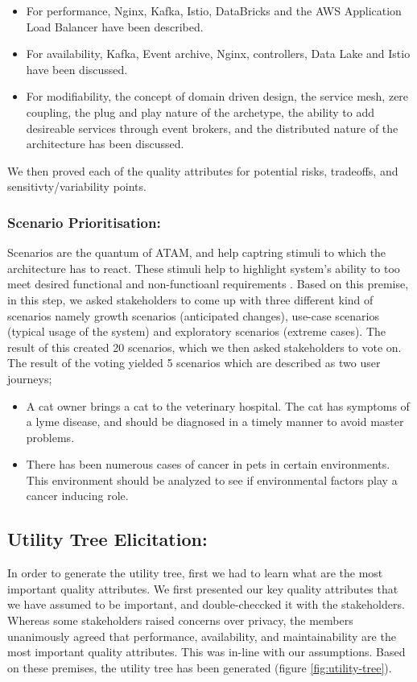 \documentclass[review]{elsarticle}
\begin{document}
\begin{itemize}
    \item For performance, Nginx, Kafka, Istio, DataBricks and the AWS Application Load Balancer have been described.
    \item For availability, Kafka, Event archive, Nginx, controllers, Data Lake and Istio have been discussed.
    \item For modifiability, the concept of domain driven design, the service mesh, zere coupling, the plug and play nature of the archetype, the ability to add desireable services through event brokers, and the distributed nature of the architecture has been discussed.
\end{itemize}

We then proved each of the quality attributes for potential risks, tradeoffs, and sensitivty/variability points.

\subsubsection{Scenario Prioritisation:}

Scenarios are the quantum of ATAM, and help captring stimuli to which the architecture has to react. These stimuli help to highlight system's ability to too meet desired functional and non-functioanl requirements \cite{KazmanATAM}. Based on this premise, in this step, we asked stakeholders to come up with three different kind of scenarios namely growth scenarios (anticipated changes), use-case scenarios (typical usage of the system) and exploratory scenarios (extreme cases). The result of this created 20 scenarios, which we then asked stakeholders to vote on. The result of the voting yielded 5 scenarios which are described as two user journeys;

\begin{itemize}
    \item A cat owner brings a cat to the veterinary hospital. The cat has symptoms of a lyme disease, and should be diagnosed in a timely manner to avoid master problems.
    \item There has been numerous cases of cancer in pets in certain environments. This environment should be analyzed to see if environmental factors play a cancer inducing role.
\end{itemize}

\subsection{Utility Tree Elicitation:}
In order to generate the utility tree, first we had to learn what are the most important quality attributes. We first presented our key quality attributes that we have assumed to be important, and double-checcked it with the stakeholders. Whereas some stakeholders raised concerns over privacy, the members unanimously agreed that performance, availability, and maintainability are the most important quality attributes. This was in-line with our assumptions. Based on these premises, the utility tree has been generated (figure \ref{fig:utility-tree}).
\end{document}
